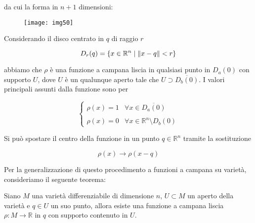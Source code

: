 da cui la forma in $ n+1 $ dimensioni:

\begin{figure}[H]
	\centering
	\texttt{[image: img50]}
\end{figure}

Considerando il disco centrato in $ q $ di raggio $ r $

\begin{equation}
	D_{r}(q) = \{ x \in \mathbb{R}^{n} \mid \norm{x - q} < r \}
\end{equation}

abbiamo che $ \rho $ è una funzione a campana liscia in qualsiasi punto in $ D_{a}(0) $ con supporto $ U $, dove $ U $ è un qualunque aperto tale che $ U \supset \overline{D_{b}(0)} $. I valori principali assunti dalla funzione sono per

\begin{equation}
	\begin{cases}
		\rho(x) = 1 & \forall x \in \overline{D_{a}(0)}\\\\
		\rho(x) = 0 & \forall x \in \mathbb{R}^{n} \setminus D_{b}(0)
	\end{cases}
\end{equation}

Si può spostare il centro della funzione in un punto $ q \in \mathbb{R}^{n} $ tramite la sostituzione

\begin{equation}
	\rho(x) \to \rho(x-q)
\end{equation}

Per la generalizzazione di questo procedimento a funzioni a campana su varietà, consideriamo il seguente teorema:

\begin{theorem}\label{bump-fun}
	Siano $ M $ una varietà differenziabile di dimensione $ n $, $ U \subset M $ un aperto della varietà e $ q \in U $ un suo punto, allora esiste una funzione a campana liscia $ \rho : M \to \mathbb{R} $ in $ q $ con supporto contenuto in $ U $.
\end{theorem}

